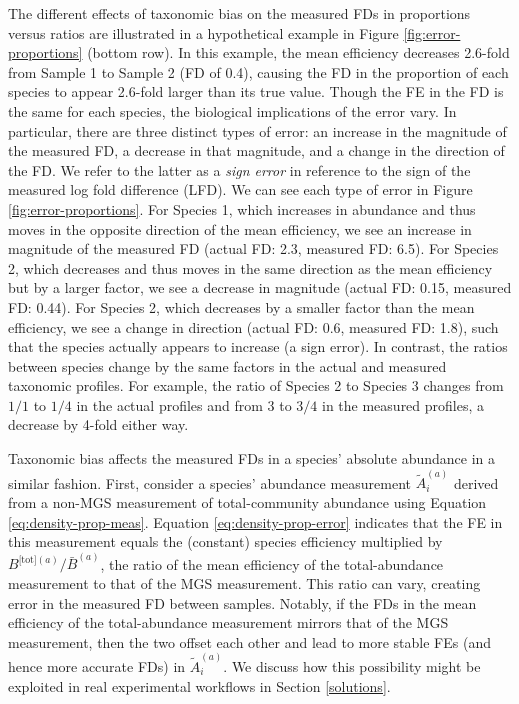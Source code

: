 \documentclass[
]{article}
\begin{document}
The different effects of taxonomic bias on the measured FDs in proportions versus ratios are illustrated in a hypothetical example in Figure \ref{fig:error-proportions} (bottom row).
In this example, the mean efficiency decreases 2.6-fold from Sample 1 to Sample 2 (FD of 0.4), causing the FD in the proportion of each species to appear 2.6-fold larger than its true value.
Though the FE in the FD is the same for each species, the biological implications of the error vary.
In particular, there are three distinct types of error: an increase in the magnitude of the measured FD, a decrease in that magnitude, and a change in the direction of the FD.
We refer to the latter as a \emph{sign error} in reference to the sign of the measured log fold difference (LFD).
We can see each type of error in Figure \ref{fig:error-proportions}.
For Species 1, which increases in abundance and thus moves in the opposite direction of the mean efficiency, we see an increase in magnitude of the measured FD (actual FD: 2.3, measured FD: 6.5).
For Species 2, which decreases and thus moves in the same direction as the mean efficiency but by a larger factor, we see a decrease in magnitude (actual FD: 0.15, measured FD: 0.44).
For Species 2, which decreases by a smaller factor than the mean efficiency, we see a change in direction (actual FD: 0.6, measured FD: 1.8), such that the species actually appears to increase (a sign error).
In contrast, the ratios between species change by the same factors in the actual and measured taxonomic profiles.
For example, the ratio of Species 2 to Species 3 changes from \(1/1\) to \(1/4\) in the actual profiles and from \(3\) to \(3/4\) in the measured profiles, a decrease by 4-fold either way.

Taxonomic bias affects the measured FDs in a species' absolute abundance in a similar fashion.
First, consider a species' abundance measurement \(\tilde A_i^{(a)}\) derived from a non-MGS measurement of total-community abundance using Equation \eqref{eq:density-prop-meas}.
Equation \eqref{eq:density-prop-error} indicates that the FE in this measurement equals the (constant) species efficiency multiplied by \({B^{{\text{[tot]}}(a)}}/{\bar B^{(a)}}\), the ratio of the mean efficiency of the total-abundance measurement to that of the MGS measurement.
This ratio can vary, creating error in the measured FD between samples.
Notably, if the FDs in the mean efficiency of the total-abundance measurement mirrors that of the MGS measurement, then the two offset each other and lead to more stable FEs (and hence more accurate FDs) in \(\tilde A_i^{(a)}\).
We discuss how this possibility might be exploited in real experimental workflows in Section \ref{solutions}.
\end{document}

